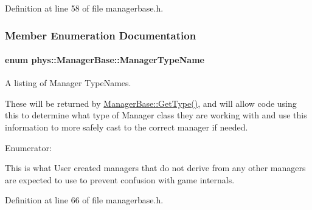 Definition at line 58 of file managerbase.h.



\subsubsection{Member Enumeration Documentation}
\hypertarget{classphys_1_1ManagerBase_aaa6ccddf23892eaccb898529414f80a5}{
\paragraph[{ManagerTypeName}]{\setlength{\rightskip}{0pt plus 5cm}enum {\bf phys::ManagerBase::ManagerTypeName}}\hfill}
\label{d2/de3/classphys_1_1ManagerBase_aaa6ccddf23892eaccb898529414f80a5}


A listing of Manager TypeNames. 

These will be returned by \hyperlink{classphys_1_1ManagerBase_aff400b6599db635e24796d8221e9a0e3}{ManagerBase::GetType()}, and will allow code using this to determine what type of Manager class they are working with and use this information to more safely cast to the correct manager if needed. \begin{Desc}
\item[Enumerator: ]\par
\begin{description}
\item[{\em 
\hypertarget{classphys_1_1ManagerBase_aaa6ccddf23892eaccb898529414f80a5a3239296e554feede76c4bcb6f824c66c}{
UserCreated}
\label{d2/de3/classphys_1_1ManagerBase_aaa6ccddf23892eaccb898529414f80a5a3239296e554feede76c4bcb6f824c66c}
}]This is what User created managers that do not derive from any other managers are expected to use to prevent confusion with game internals. \end{description}
\end{Desc}



Definition at line 66 of file managerbase.h.



